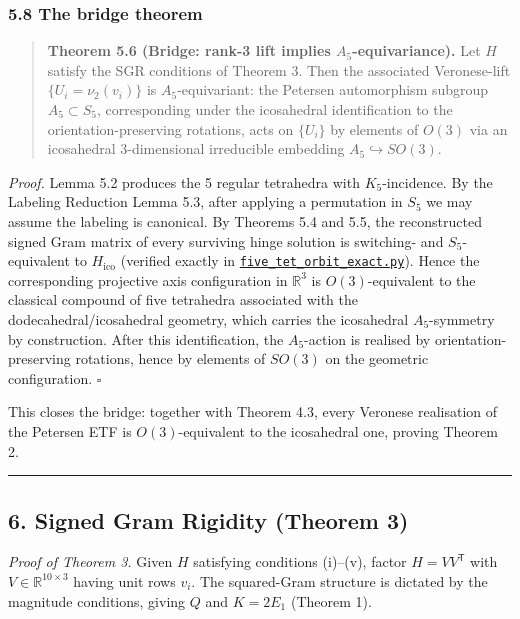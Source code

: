 \documentclass[
]{article}
\begin{document}
\subsubsection{5.8 The bridge theorem}\label{the-bridge-theorem}

\begin{quote}
\textbf{Theorem 5.6 (Bridge: rank-3 lift implies \(A_5\)-equivariance).}
Let \(H\) satisfy the SGR conditions of Theorem 3. Then the associated
Veronese-lift \(\{U_i = \nu_2(v_i)\}\) is \(A_5\)-equivariant: the
Petersen automorphism subgroup \(A_5 \subset S_5\), corresponding under
the icosahedral identification to the orientation-preserving rotations,
acts on \(\{U_i\}\) by elements of \(O(3)\) via an icosahedral
3-dimensional irreducible embedding \(A_5 \hookrightarrow SO(3)\).
\end{quote}

\emph{Proof.} Lemma 5.2 produces the 5 regular tetrahedra with
\(K_5\)-incidence. By the Labeling Reduction Lemma 5.3, after applying a
permutation in \(S_5\) we may assume the labeling is canonical. By
Theorems 5.4 and 5.5, the reconstructed signed Gram matrix of every
surviving hinge solution is switching- and \(S_5\)-equivalent to
\(H_{\mathrm{ico}}\) (verified exactly in
\href{../scripts/five_tet_orbit_exact.py}{\texttt{five\_tet\_orbit\_exact.py}}).
Hence the corresponding projective axis configuration in
\(\mathbb{R}^3\) is \(O(3)\)-equivalent to the classical compound of
five tetrahedra associated with the dodecahedral/icosahedral geometry,
which carries the icosahedral \(A_5\)-symmetry by construction. After
this identification, the \(A_5\)-action is realised by
orientation-preserving rotations, hence by elements of \(SO(3)\) on the
geometric configuration. \(\square\)

This closes the bridge: together with Theorem 4.3, every Veronese
realisation of the Petersen ETF is \(O(3)\)-equivalent to the
icosahedral one, proving Theorem 2.

\begin{center}\rule{0.5\linewidth}{0.5pt}\end{center}

\subsection{6. Signed Gram Rigidity (Theorem
3)}\label{signed-gram-rigidity-theorem-3}

\emph{Proof of Theorem 3.} Given \(H\) satisfying conditions (i)--(v),
factor \(H = V V^{\mathsf T}\) with \(V \in \mathbb{R}^{10\times 3}\)
having unit rows \(v_i\). The squared-Gram structure is dictated by the
magnitude conditions, giving \(Q\) and \(K = 2 E_1\) (Theorem 1).
\end{document}
